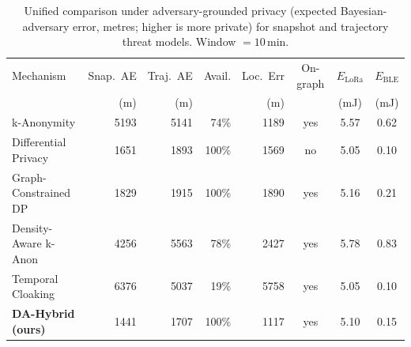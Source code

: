 \begin{table}[t]
\centering
\caption{Unified comparison under adversary-grounded privacy (expected Bayesian-adversary error, metres; higher is more private) for snapshot and trajectory threat models. Window $=10$\,min.}
\label{tab:unified}
\begin{tabular}{lrrrrccc}
\toprule
Mechanism & Snap.\ AE & Traj.\ AE & Avail. & Loc.\ Err & On-graph & $E_{\mathrm{LoRa}}$ & $E_{\mathrm{BLE}}$ \\
 & (m) & (m) & & (m) & & (mJ) & (mJ) \\
\midrule
k-Anonymity & 5193 & 5141 & 74\% & 1189 & yes & 5.57 & 0.62 \\
Differential Privacy & 1651 & 1893 & 100\% & 1569 & no & 5.05 & 0.10 \\
Graph-Constrained DP & 1829 & 1915 & 100\% & 1890 & yes & 5.16 & 0.21 \\
Density-Aware k-Anon & 4256 & 5563 & 78\% & 2427 & yes & 5.78 & 0.83 \\
Temporal Cloaking & 6376 & 5037 & 19\% & 5758 & yes & 5.05 & 0.10 \\
\textbf{DA-Hybrid (ours)} & 1441 & 1707 & 100\% & 1117 & yes & 5.10 & 0.15 \\
\bottomrule
\end{tabular}
\end{table}